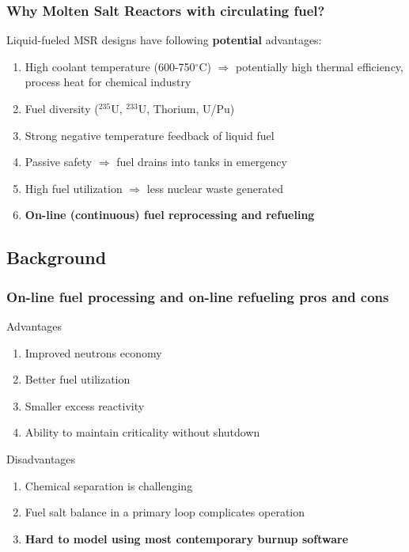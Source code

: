 \begin{frame}
\frametitle{Why Molten Salt Reactors with circulating fuel?}
\begin{block}{Liquid-fueled \gls{MSR} designs have following \textbf{potential} advantages:}
	\begin{enumerate}
		\itemsep1em
		\item High coolant temperature (600-750$^{\circ}$C) 
		$\Rightarrow$ potentially high thermal efficiency, process 
		heat for chemical industry
		\item Fuel diversity ($^{235}$U, $^{233}$U, Thorium, U/Pu)
		\item Strong negative temperature feedback of liquid fuel
		\item Passive safety $\Rightarrow$ fuel drains into tanks 
		in emergency
		\item High fuel utilization $\Rightarrow$ less nuclear 
		waste generated
		\item<2> \textbf{On-line (continuous) fuel reprocessing and refueling}
	\end{enumerate}
\end{block}

\end{frame}


\subsection{Background}


\begin{frame}
\frametitle{On-line fuel processing and on-line refueling pros and 
cons}
\begin{block}{Advantages}
	\begin{enumerate}
		\item Improved neutrons economy
		\item Better fuel utilization
		\item Smaller excess reactivity
		\item Ability to maintain criticality without shutdown
	\end{enumerate}
\end{block}

\begin{block}{Disadvantages}
	\begin{enumerate}
		\item Chemical separation is challenging
		\item Fuel salt balance in a primary loop complicates operation
		\item \textbf{Hard to model using most contemporary burnup software}
	\end{enumerate}
\end{block}

\end{frame}


